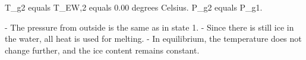 T_g2 equals T_EW,2 equals 0.00 degrees Celsius.  
P_g2 equals P_g1.  

- The pressure from outside is the same as in state 1.  
- Since there is still ice in the water, all heat is used for melting.  
- In equilibrium, the temperature does not change further, and the ice content remains constant.